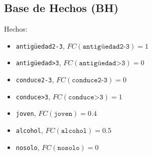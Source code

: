 \subsection{Base de Hechos (BH)}
Hechos:
\begin{itemize}
    \item \texttt{antigüedad2-3}, $FC(\texttt{antigüedad2-3}) = 1$
    \item \texttt{antigüedad>3}, $FC(\texttt{antigüedad>3}) = 0$
    \item \texttt{conduce2-3}, $FC(\texttt{conduce2-3}) = 0$
    \item \texttt{conduce>3}, $FC(\texttt{conduce>3}) = 1$
    \item \texttt{joven}, $FC(\texttt{joven}) = 0.4$
    \item \texttt{alcohol}, $FC(\texttt{alcohol}) = 0.5$
    \item \texttt{nosolo}, $FC(\texttt{nosolo}) = 0$
\end{itemize}
\newpage
